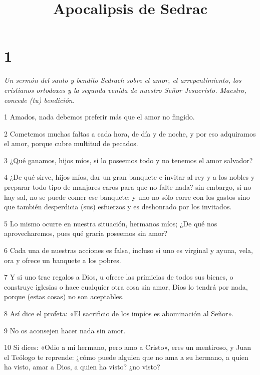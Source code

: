 

\title{Apocalipsis de Sedrac}

\chapter{1}

\par \textit{Un sermón del santo y bendito Sedrach sobre el amor, el arrepentimiento, los cristianos ortodoxos y la segunda venida de nuestro Señor Jesucristo. Maestro, concede (tu) bendición.}

\par 1 Amados, nada debemos preferir más que el amor no fingido.

\par 2 Cometemos muchas faltas a cada hora, de día y de noche, y por eso adquiramos el amor, porque cubre multitud de pecados.

\par 3 ¿Qué ganamos, hijos míos, si lo poseemos todo y no tenemos el amor salvador?

\par 4 ¿De qué sirve, hijos míos, dar un gran banquete e invitar al rey y a los nobles y preparar todo tipo de manjares caros para que no falte nada? sin embargo, si no hay sal, no se puede comer ese banquete; y uno no sólo corre con los gastos sino que también desperdicia (sus) esfuerzos y es deshonrado por los invitados.

\par 5 Lo mismo ocurre en nuestra situación, hermanos míos; ¿De qué nos aprovecharemos, pues qué gracia poseemos sin amor?

\par 6 Cada una de nuestras acciones es falsa, incluso si uno es virginal y ayuna, vela, ora y ofrece un banquete a los pobres.

\par 7 Y si uno trae regalos a Dios, u ofrece las primicias de todos sus bienes, o construye iglesias o hace cualquier otra cosa sin amor, Dios lo tendrá por nada, porque (estas cosas) no son aceptables.

\par 8 Así dice el profeta: «El sacrificio de los impíos es abominación al Señor».

\par 9 No os aconsejen hacer nada sin amor.

\par 10 Si dices: «Odio a mi hermano, pero amo a Cristo», eres un mentiroso, y Juan el Teólogo te reprende: ¿cómo puede alguien que no ama a su hermano, a quien ha visto, amar a Dios, a quien ha visto? ¿no visto?

